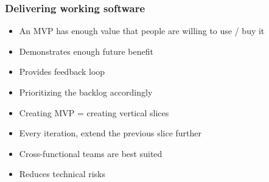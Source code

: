 \subsubsection{Delivering working software}
\begin{itemize}
    \item An MVP has enough value that people are willing to use / buy it
    \item Demonstrates enough future benefit
    \item Provides feedback loop
    \item Prioritizing the backlog accordingly
    \item Creating MVP = creating vertical slices
    \item Every iteration, extend the previous slice further
    \item Cross-functional teams are best suited
    \item Reduces technical risks
\end{itemize}

